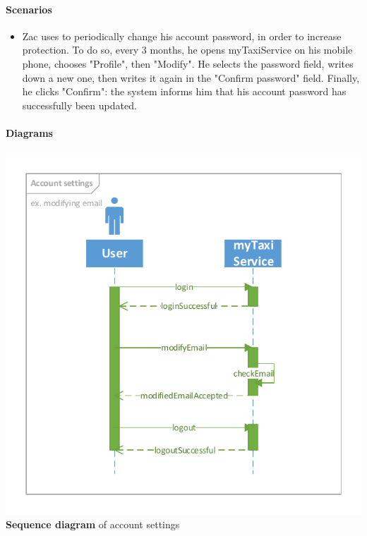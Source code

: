 	\paragraph{Scenarios}
		\begin{itemize}
			\item Zac uses to periodically change his account password, in order to increase protection. To do so, every 3 months, he opens myTaxiService on his mobile phone, chooses "Profile", then "Modify". He selects the password field, writes down a new one, then writes it again in the "Confirm password" field. Finally, he clicks "Confirm": the system informs him that his account password has successfully been updated.
		\end{itemize}
	
	\paragraph{Diagrams}
		\begin{center}
			\includegraphics[width=\textwidth]{diagrams/account_settings}
			\textbf{Sequence diagram} of account settings
		\end{center}
